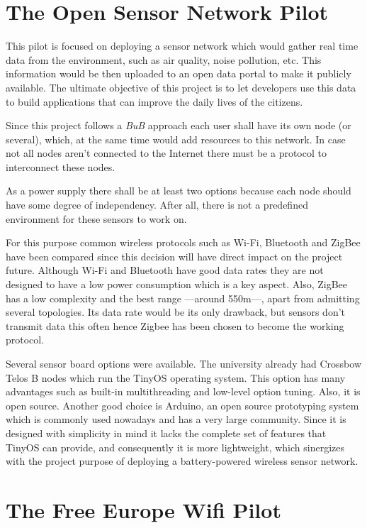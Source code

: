 \documentclass[draftclsnofoot,12pt,journal,onecolumn]{IEEEtran}
\begin{document}
\section{The Open Sensor Network Pilot}
\label{sec:osn}

This pilot is focused on deploying a sensor network which would gather real time data from the environment, such as air quality, noise pollution, etc. This information would be then uploaded to an open data portal to make it publicly available. The ultimate objective of this project is to let developers use this data to build applications that can improve the daily lives of the citizens.

Since this project follows a \emph{BuB} approach each user shall have its own node (or several), which, at the same time would add resources to this network. In case not all nodes aren't connected to the Internet there must be a protocol to interconnect these nodes.

As a power supply there shall be at least two options because each node should have some degree of independency. After all, there is not a predefined environment for these sensors to work on.

For this purpose common wireless protocols such as Wi-Fi, Bluetooth and ZigBee have been compared since this decision will have direct impact on the project future. Although Wi-Fi and Bluetooth have good data rates they are not designed to have a low power consumption which is a key aspect. Also, ZigBee has a low complexity and the best range ---around 550m---, apart from admitting several topologies. Its data rate would be its only drawback, but sensors don't transmit data this often hence Zigbee has been chosen to become the working protocol.

Several sensor board options were available. The university already had Crossbow Telos B nodes which run the TinyOS operating system. This option has many advantages such as built-in multithreading and low-level option tuning. Also, it is open source. Another good choice is Arduino, an open source prototyping system which is commonly used nowadays and has a very large community. Since it is designed with simplicity in mind it lacks the complete set of features that TinyOS can provide, and consequently it is more lightweight, which sinergizes with the project purpose of deploying a battery-powered wireless sensor network.

\section{The Free Europe Wifi Pilot}
\label{sec:few}
\end{document}
